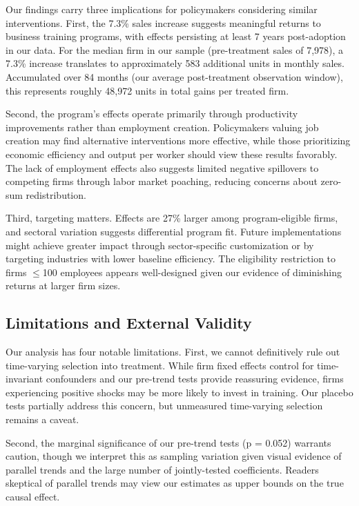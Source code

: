 \documentclass{article}
\begin{document}
Our findings carry three implications for policymakers considering similar interventions. First, the 7.3\% sales increase suggests meaningful returns to business training programs, with effects persisting at least 7 years post-adoption in our data. For the median firm in our sample (pre-treatment sales of 7,978), a 7.3\% increase translates to approximately 583 additional units in monthly sales. Accumulated over 84 months (our average post-treatment observation window), this represents roughly 48,972 units in total gains per treated firm.

Second, the program's effects operate primarily through productivity improvements rather than employment creation. Policymakers valuing job creation may find alternative interventions more effective, while those prioritizing economic efficiency and output per worker should view these results favorably. The lack of employment effects also suggests limited negative spillovers to competing firms through labor market poaching, reducing concerns about zero-sum redistribution.

Third, targeting matters. Effects are 27\% larger among program-eligible firms, and sectoral variation suggests differential program fit. Future implementations might achieve greater impact through sector-specific customization or by targeting industries with lower baseline efficiency. The eligibility restriction to firms $\leq$100 employees appears well-designed given our evidence of diminishing returns at larger firm sizes.

\subsection{Limitations and External Validity}

Our analysis has four notable limitations. First, we cannot definitively rule out time-varying selection into treatment. While firm fixed effects control for time-invariant confounders and our pre-trend tests provide reassuring evidence, firms experiencing positive shocks may be more likely to invest in training. Our placebo tests partially address this concern, but unmeasured time-varying selection remains a caveat.

Second, the marginal significance of our pre-trend tests (p = 0.052) warrants caution, though we interpret this as sampling variation given visual evidence of parallel trends and the large number of jointly-tested coefficients. Readers skeptical of parallel trends may view our estimates as upper bounds on the true causal effect.
\end{document}
